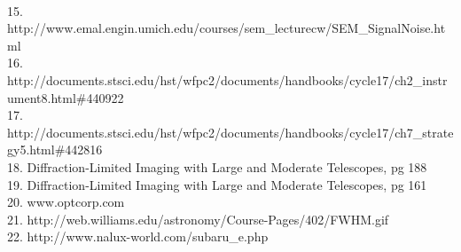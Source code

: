 \documentclass[pdf,color]{UoBnote}
\begin{document}
\\
15. http://www.emal.engin.umich.edu/courses/sem\_lecturecw/SEM\_SignalNoise.html
\\
16.	http://documents.stsci.edu/hst/wfpc2/documents/handbooks/cycle17/ch2\_instrument8.html\#440922
\\
17.	http://documents.stsci.edu/hst/wfpc2/documents/handbooks/cycle17/ch7\_strategy5.html\#442816
\\
18. Diffraction-Limited Imaging with Large and Moderate Telescopes, pg 188
\\
19. Diffraction-Limited Imaging with Large and Moderate Telescopes, pg 161
\\
20. www.optcorp.com
\\
21. http://web.williams.edu/astronomy/Course-Pages/402/FWHM.gif
\\
22. http://www.nalux-world.com/subaru\_e.php
\end{document}
